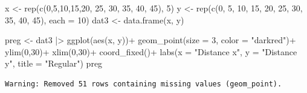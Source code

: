 \documentclass[
  letterpaper,
  DIV=11,
  numbers=noendperiod]{scrreprt}
\newenvironment{Shaded}{\begin{snugshade}}{\end{snugshade}}
\newcommand{\AttributeTok}[1]{\textcolor[rgb]{0.40,0.45,0.13}{#1}}
\newcommand{\DecValTok}[1]{\textcolor[rgb]{0.68,0.00,0.00}{#1}}
\newcommand{\FunctionTok}[1]{\textcolor[rgb]{0.28,0.35,0.67}{#1}}
\newcommand{\NormalTok}[1]{\textcolor[rgb]{0.00,0.23,0.31}{#1}}
\newcommand{\OtherTok}[1]{\textcolor[rgb]{0.00,0.23,0.31}{#1}}
\newcommand{\SpecialCharTok}[1]{\textcolor[rgb]{0.37,0.37,0.37}{#1}}
\newcommand{\StringTok}[1]{\textcolor[rgb]{0.13,0.47,0.30}{#1}}
\begin{document}
\begin{Shaded}
\begin{Highlighting}[]
\NormalTok{x }\OtherTok{\textless{}{-}} \FunctionTok{rep}\NormalTok{(}\FunctionTok{c}\NormalTok{(}\DecValTok{0}\NormalTok{,}\DecValTok{5}\NormalTok{,}\DecValTok{10}\NormalTok{,}\DecValTok{15}\NormalTok{,}\DecValTok{20}\NormalTok{, }\DecValTok{25}\NormalTok{, }\DecValTok{30}\NormalTok{, }\DecValTok{35}\NormalTok{, }\DecValTok{40}\NormalTok{, }\DecValTok{45}\NormalTok{), }\DecValTok{5}\NormalTok{) }
\NormalTok{y }\OtherTok{\textless{}{-}} \FunctionTok{rep}\NormalTok{(}\FunctionTok{c}\NormalTok{(}\DecValTok{0}\NormalTok{, }\DecValTok{5}\NormalTok{, }\DecValTok{10}\NormalTok{, }\DecValTok{15}\NormalTok{, }\DecValTok{20}\NormalTok{, }\DecValTok{25}\NormalTok{, }\DecValTok{30}\NormalTok{, }\DecValTok{35}\NormalTok{, }\DecValTok{40}\NormalTok{, }\DecValTok{45}\NormalTok{), }\AttributeTok{each =} \DecValTok{10}\NormalTok{)}
\NormalTok{dat3 }\OtherTok{\textless{}{-}} \FunctionTok{data.frame}\NormalTok{(x, y)}

\NormalTok{preg }\OtherTok{\textless{}{-}}\NormalTok{ dat3 }\SpecialCharTok{|\textgreater{}}
  \FunctionTok{ggplot}\NormalTok{(}\FunctionTok{aes}\NormalTok{(x, y))}\SpecialCharTok{+}
  \FunctionTok{geom\_point}\NormalTok{(}\AttributeTok{size =} \DecValTok{3}\NormalTok{, }\AttributeTok{color =} \StringTok{"darkred"}\NormalTok{)}\SpecialCharTok{+}
  \FunctionTok{ylim}\NormalTok{(}\DecValTok{0}\NormalTok{,}\DecValTok{30}\NormalTok{)}\SpecialCharTok{+}
  \FunctionTok{xlim}\NormalTok{(}\DecValTok{0}\NormalTok{,}\DecValTok{30}\NormalTok{)}\SpecialCharTok{+}
  \FunctionTok{coord\_fixed}\NormalTok{()}\SpecialCharTok{+}
  \FunctionTok{labs}\NormalTok{(}\AttributeTok{x =} \StringTok{"Distance x"}\NormalTok{, }\AttributeTok{y =} \StringTok{"Distance y"}\NormalTok{, }
       \AttributeTok{title =} \StringTok{"Regular"}\NormalTok{)}
\NormalTok{preg}
\end{Highlighting}
\end{Shaded}

\begin{verbatim}
Warning: Removed 51 rows containing missing values (geom_point).
\end{verbatim}
\end{document}
